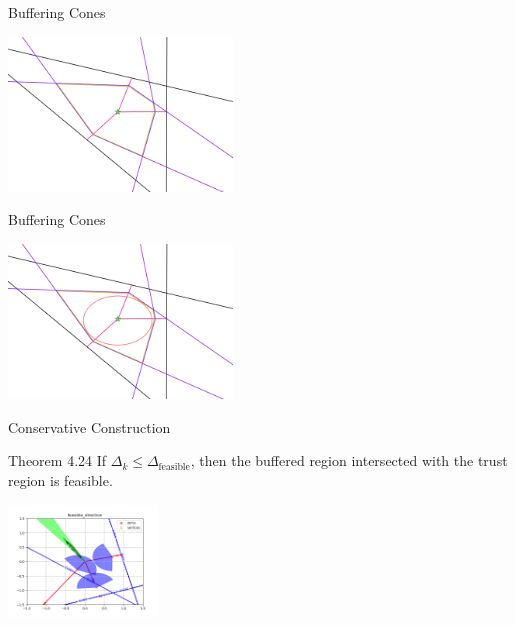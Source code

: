 \documentclass{beamer}
\begin{document}
\begin{frame}{Buffering Cones}
	\begin{center}
		\includegraphics[width=225px]{images/completed_1.png}
	\end{center}
\end{frame}


\begin{frame}{Buffering Cones}
	\begin{center}
		\includegraphics[width=225px]{images/completed_2.png}
	\end{center}
\end{frame}

\begin{frame}{Conservative Construction}
	\begin{block}{Theorem 4.24}
		If $\Delta_k \le \Delta_{\textrm{feasible}}$, then the buffered region intersected with the trust region is feasible.
	\end{block}
	\begin{center}
		\includegraphics[width=150px]{images/feasible_direction.png}
	\end{center}
\end{frame}
\end{document}
